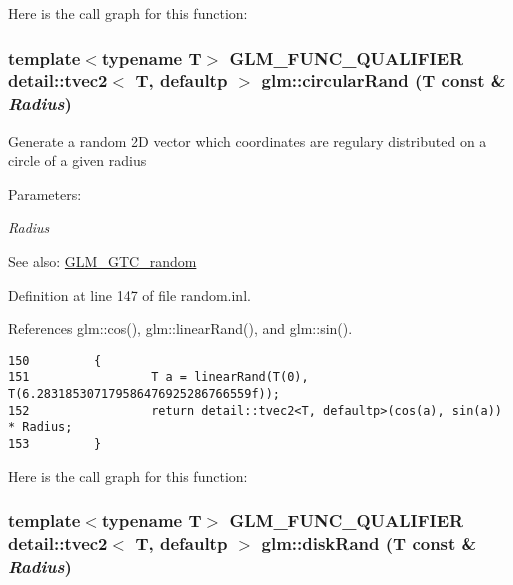 Here is the call graph for this function:\hypertarget{group__gtc__random_gb633996dfedab1a7f45bb5cfa1b14443}{
\subsubsection[circularRand]{\setlength{\rightskip}{0pt plus 5cm}template$<$typename T$>$ GLM\_\-FUNC\_\-QUALIFIER detail::tvec2$<$ T, defaultp $>$ glm::circularRand (T const \& {\em Radius})}}
\label{group__gtc__random_gb633996dfedab1a7f45bb5cfa1b14443}


Generate a random 2D vector which coordinates are regulary distributed on a circle of a given radius

\begin{Desc}
\item[Parameters:]
\begin{description}
\item[{\em Radius}]\end{description}
\end{Desc}
\begin{Desc}
\item[See also:]\hyperlink{group__gtc__random}{GLM\_\-GTC\_\-random} \end{Desc}


Definition at line 147 of file random.inl.

References glm::cos(), glm::linearRand(), and glm::sin().

\begin{Code}\begin{verbatim}150         {
151                 T a = linearRand(T(0), T(6.283185307179586476925286766559f));
152                 return detail::tvec2<T, defaultp>(cos(a), sin(a)) * Radius;             
153         }
\end{verbatim}
\end{Code}




Here is the call graph for this function:\hypertarget{group__gtc__random_gea707507f941467133dfdd4f3de9eeed}{
\subsubsection[diskRand]{\setlength{\rightskip}{0pt plus 5cm}template$<$typename T$>$ GLM\_\-FUNC\_\-QUALIFIER detail::tvec2$<$ T, defaultp $>$ glm::diskRand (T const \& {\em Radius})}}
\label{group__gtc__random_gea707507f941467133dfdd4f3de9eeed}


